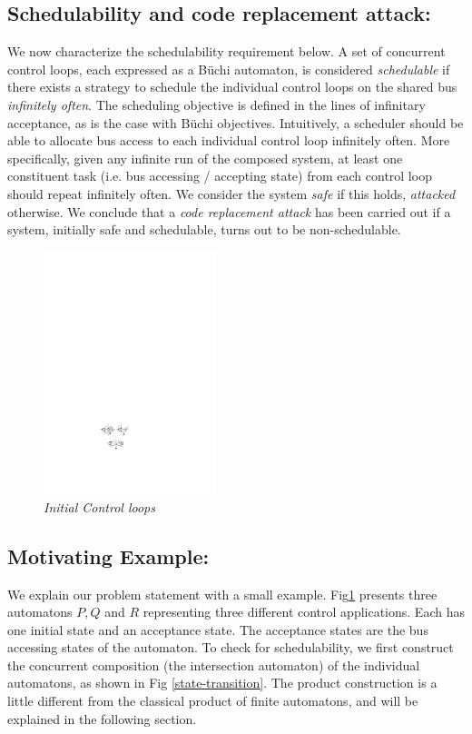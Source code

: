 \subsection{Schedulability and code replacement attack:} 
\noindent
We now characterize the schedulability requirement below. 
A set of concurrent control loops, each expressed as a B\"{u}chi automaton, is considered {\em schedulable} if there exists a strategy to schedule the individual control loops on the shared bus {\em infinitely often}.
The scheduling objective is defined in the lines of infinitary acceptance, as is the case with B\"{u}chi objectives. Intuitively, a scheduler should be able to allocate bus access to each individual control loop infinitely often. More specifically, given any infinite run of the composed system, at least one constituent task (i.e. bus accessing / accepting state) from each control loop should repeat infinitely often. We consider the system {\em safe} if this holds, {\em attacked} otherwise. We conclude that a {\em code replacement attack} has been carried out if a system,  initially safe and schedulable, turns out to be non-schedulable. 

\begin{figure}
\begin{center}
\includegraphics[width=50mm]{original.pdf}
\end{center}
\caption{{\em Initial Control loops}}
\label{state}
\end{figure}

\subsection{Motivating Example:}
\noindent
We explain our problem statement with a small example. Fig\ref{state} presents three automatons $P,Q$ and $R$ representing three different control applications.
Each has one initial state and an acceptance state. The acceptance states are the bus accessing states
of the automaton. To check for schedulability, we first construct the concurrent composition (the intersection automaton) of the individual automatons, as shown in Fig \ref{state-transition}. The product construction is a little different from the classical product of finite automatons, and will be explained in the following section. \\ 

